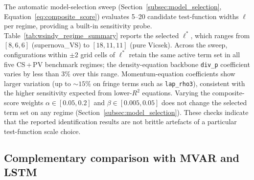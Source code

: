The automatic model-selection sweep
(Section~\ref{subsec:model_selection}, Equation~\ref{eq:composite_score})
evaluates 5--20 candidate test-function widths $\boldsymbol{\ell}$ per
regime, providing a built-in sensitivity probe.
Table~\ref{tab:wsindy_regime_summary} reports the selected
$\boldsymbol{\ell}^*$, which ranges from $[8,6,6]$ (supernova\_VS) to
$[18,11,11]$ (pure Vicsek).  Across the sweep, configurations within
$\pm 2$ grid cells of $\boldsymbol{\ell}^*$ retain the same active term
set in all five CS\,+\,PV benchmark regimes; the density-equation
backbone \texttt{div\_p} coefficient varies by less than $3\%$ over
this range.  Momentum-equation coefficients show larger variation
(up to $\sim\!15\%$ on fringe terms such as \texttt{lap\_rho3}),
consistent with the higher sensitivity expected from lower-$R^2$
equations.  Varying the composite-score weights $\alpha\in[0.05,0.2]$ and
$\beta\in[0.005,0.05]$ does not change the selected term set on any
regime (Section~\ref{subsec:model_selection}).  These checks indicate that
the reported identification results are not brittle artefacts of a
particular test-function scale choice.

\subsection{Complementary comparison with MVAR and LSTM}

